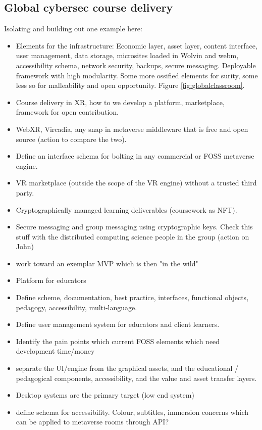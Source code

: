 \documentclass[
	12pt, %
	fleqn, %
	a4paper, %
	oneside, %
]{LegrandOrangeBook}
\begin{document}
\subsection{Global cybersec course delivery}
Isolating and building out one example here:
\begin{itemize}
\item Elements for the infrastructure: Economic layer, asset layer, content interface, user management, data storage, microsites loaded in Wolvin and webm, accessibility schema, network security, backups, secure messaging. Deployable framework with high modularity. Some more ossified elements for surity, some less so for malleability and open opportunity. Figure \ref{fig:globalclassroom}.
\item Course delivery in XR, how to we develop a platform, marketplace, framework for open contribution.
\item WebXR, Vircadia, any snap in metaverse middleware that is free and open source (action to compare the two). 
\item Define an interface schema for bolting in any commercial or FOSS metaverse engine.
\item VR marketplace (outside the scope of the VR engine) without a trusted third party.
\item Cryptographically managed learning deliverables (coursework as NFT). 
\item Secure messaging and group messaging using cryptographic keys. Check this stuff with the distributed computing science people in the group (action on John)
\item work toward an exemplar MVP which is then "in the wild"
\item Platform for educators
\item Define scheme, documentation, best practice, interfaces, functional objects, pedagogy, accessibility, multi-language. 
\item Define user management system for educators and client learners.
\item Identify the pain points which current FOSS elements which need development time/money
\item separate the UI/engine from the graphical assets, and the educational / pedagogical components, accessibility, and the value and asset transfer layers.
\item Desktop systems are the primary target (low end system)
\item define schema for accessibility. Colour, subtitles, immersion concerns which can be applied to metaverse rooms through API?

\end{itemize}
\end{document}
